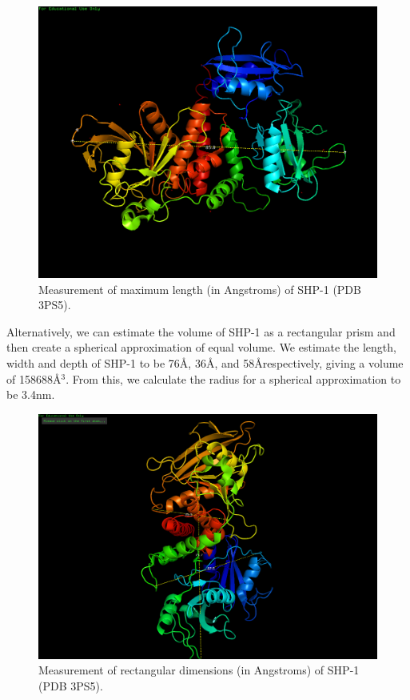 \documentclass[../../AdvancementSummary.tex]{subfiles}
\begin{document}
\begin{figure}[H]
\includegraphics[width=\linewidth]{ResultsFigures/SHP1PyMol/Diagonal1.png}
\caption{Measurement of maximum length (in Angstroms) of SHP-1 (PDB 3PS5). }
\end{figure}

Alternatively, we can estimate the volume of SHP-1 as a rectangular prism and then create a spherical approximation of equal volume. We estimate the length, width and depth of SHP-1 to be 76\AA, 36\AA, and 58\AA respectively, giving a volume of 158688\AA$^3$.  From this, we calculate the radius for a spherical approximation to be 3.4nm.

\begin{figure}[H]
\includegraphics[width=\linewidth]{ResultsFigures/SHP1PyMol/LengthWidthDepth.png}
\caption{Measurement of rectangular dimensions (in Angstroms) of SHP-1 (PDB 3PS5).  }
\end{figure}
\end{document}
